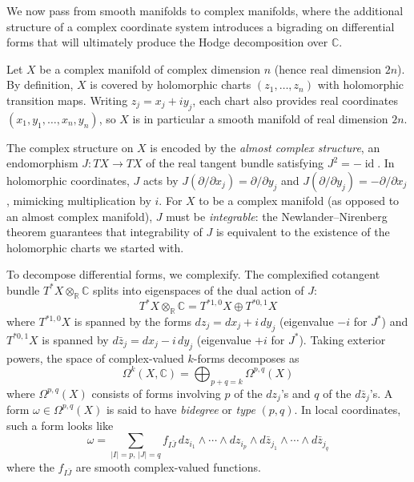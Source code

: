 \documentclass{article}
\newcommand{\C}{\mathbb{C}}
\newcommand{\R}{\mathbb{R}}
\newcommand{\id}{\operatorname{id}}
\begin{document}
We now pass from smooth manifolds to complex manifolds, where the additional
structure of a complex coordinate system introduces a bigrading on differential
forms that will ultimately produce the Hodge decomposition over $\C$.

Let $X$ be a complex manifold of complex dimension $n$ (hence real dimension
$2n$). By definition, $X$ is covered by holomorphic charts
$(z_1, \ldots, z_n)$ with holomorphic transition maps. Writing
$z_j = x_j + iy_j$, each chart also provides real coordinates
$(x_1, y_1, \ldots, x_n, y_n)$, so $X$ is in particular a smooth manifold of
real dimension $2n$.

The complex structure on $X$ is encoded by the \emph{almost complex structure},
an endomorphism $J: TX \to TX$ of the real tangent bundle satisfying
$J^2 = -\id$. In holomorphic coordinates, $J$ acts by
$J(\partial/\partial x_j) = \partial/\partial y_j$ and
$J(\partial/\partial y_j) = -\partial/\partial x_j$, mimicking multiplication
by $i$. For $X$ to be a complex manifold (as opposed to an almost
complex manifold), $J$ must be \emph{integrable}: the Newlander--Nirenberg
theorem guarantees that integrability of $J$ is equivalent to the existence of
the holomorphic charts we started with.

To decompose differential forms, we complexify. The complexified cotangent
bundle $T^*X \otimes_\R \C$ splits into eigenspaces of the dual action of $J$:
\[
  T^*X \otimes_\R \C = T^{*1,0}X \oplus T^{*0,1}X
\]
where $T^{*1,0}X$ is spanned by the forms $dz_j = dx_j + i\,dy_j$
(eigenvalue $-i$ for $J^*$) and $T^{*0,1}X$ is spanned by
$d\bar{z}_j = dx_j - i\,dy_j$ (eigenvalue $+i$ for $J^*$). Taking exterior
powers, the space of complex-valued $k$-forms decomposes as
\[
  \Omega^k(X, \C) = \bigoplus_{p+q=k} \Omega^{p,q}(X)
\]
where $\Omega^{p,q}(X)$ consists of forms involving $p$ of the $dz_j$'s and
$q$ of the $d\bar{z}_j$'s. A form $\omega \in \Omega^{p,q}(X)$ is said to
have \emph{bidegree} or \emph{type} $(p,q)$. In local coordinates, such a form
looks like
\[
  \omega = \sum_{|I|=p,\, |J|=q} f_{I\bar{J}}\, dz_{i_1} \wedge \cdots
    \wedge dz_{i_p} \wedge d\bar{z}_{j_1} \wedge \cdots \wedge d\bar{z}_{j_q}
\]
where the $f_{I\bar{J}}$ are smooth complex-valued functions.
\end{document}
